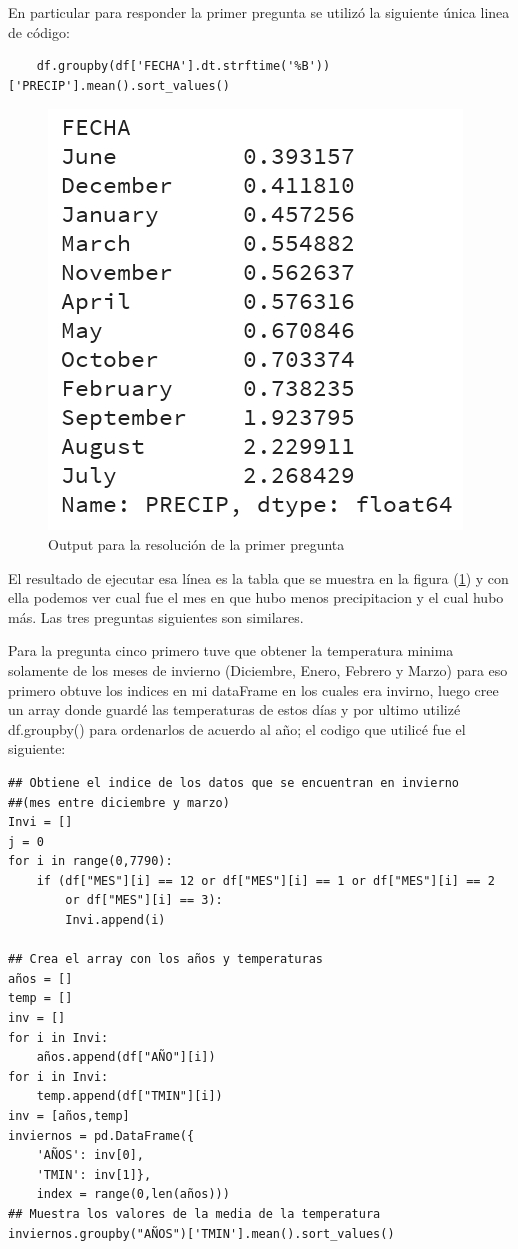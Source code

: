\documentclass[12pt]{article}
\begin{document}
En particular para responder la primer pregunta se utilizó la siguiente única linea de código:
\begin{verbatim}
    df.groupby(df['FECHA'].dt.strftime('%B'))['PRECIP'].mean().sort_values()
\end{verbatim}
\begin{figure}
    \centering
    \includegraphics[scale = .5]{tabla.png}
    \caption{Output para la resolución de la primer pregunta}
    \label{fig:linea1}
\end{figure}
El resultado de ejecutar esa línea es la tabla que se muestra en la figura (\ref{fig:linea1}) y con ella podemos ver cual fue el mes en que hubo menos precipitacion y el cual hubo más.
Las tres preguntas siguientes son similares.

Para la pregunta cinco primero tuve que obtener la temperatura minima solamente de los meses de invierno (Diciembre, Enero, Febrero y Marzo) para eso primero obtuve los indices en mi dataFrame en los cuales era invirno, luego cree un array donde guardé las temperaturas de estos días y por ultimo utilizé df.groupby() para ordenarlos de acuerdo al año; el codigo que utilicé fue el siguiente:
\begin{verbatim}
## Obtiene el indice de los datos que se encuentran en invierno 
##(mes entre diciembre y marzo)
Invi = []
j = 0
for i in range(0,7790):
    if (df["MES"][i] == 12 or df["MES"][i] == 1 or df["MES"][i] == 2 
        or df["MES"][i] == 3):
        Invi.append(i)

## Crea el array con los años y temperaturas
años = []
temp = []
inv = []
for i in Invi:
    años.append(df["AÑO"][i])
for i in Invi:
    temp.append(df["TMIN"][i])
inv = [años,temp]
inviernos = pd.DataFrame({
    'AÑOS': inv[0],
    'TMIN': inv[1]},
    index = range(0,len(años)))
## Muestra los valores de la media de la temperatura
inviernos.groupby("AÑOS")['TMIN'].mean().sort_values()
\end{verbatim}
\end{document}
